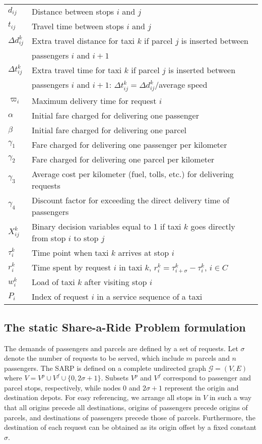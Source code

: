 \documentclass[preprint,authoryear,12pt]{elsarticle}
\begin{document}
\begin{table*}
\begin{tabular}{ll}
$d_{ij}$& Distance between stops $i$ and $j$\\
$t_{ij}$& Travel time between stops $i$ and $j$\\
$\Delta d_{ij}^{k}$ & Extra travel distance for taxi $k$ if parcel $j$ is inserted between \\
& passengers $i$ and $i+1$\\
$\Delta t_{ij}^{k}$ & Extra travel time for taxi $k$ if parcel $j$ is inserted between \\
&passengers $i$ and $i+1$: $\Delta t_{ij}^{k}=\Delta d_{ij}^{k}$/average speed\\
$\varpi_i$ & Maximum delivery time for request $i$\\
$\alpha$ & Initial fare charged for delivering one passenger\\
$\beta$  & Initial fare charged for delivering one parcel\\
$\gamma_1$ & Fare charged for delivering one passenger per kilometer\\
$\gamma_2$ & Fare charged for delivering one parcel per kilometer\\
$\gamma_3$ & Average cost per kilometer (fuel, tolls, etc.) for delivering requests\\
$\gamma_4$ & Discount factor for exceeding the direct delivery time of passengers\\
\hline
$X_{ij}^{k}$ & Binary decision variables equal to 1 if taxi $k$ goes
directly from stop $i$ to stop $j$\\
$\tau_i^k$& Time point when taxi $k$ arrives at stop $i$\\
$r_i^k$& Time spent by request $i$ in taxi $k$, $r_i^k=\tau_{i+\sigma}^k-\tau_{i}^k$, $i\in C$\\
$w_i^k$& Load of taxi $k$ after visiting stop $i$\\
$P_i$ & Index of request $i$ in a service sequence of a taxi\\
\hline
\end{tabular}
\label{notation}
\end{table*}



\subsection{The static Share-a-Ride Problem formulation}
\label{ssarp_model}
The demands of passengers and parcels are defined by a set of requests. Let $\sigma$ denote the number of requests to be served, which include $m$ parcels and $n$ passengers. The SARP is defined on a complete undirected graph $\mathcal{G} = (V,E)$ where $V = V^p\cup V^f \cup \{0,2\sigma+1\}$. Subsets $V^p$ and $V^f$ correspond to passenger and parcel stops, respectively, while nodes $0$ and $2\sigma + 1$ represent the origin and destination depots. For easy referencing, we arrange all stops in $V$ in such a way that all origins precede all destinations, origins of passengers precede origins of parcels, and destinations of passengers precede those of parcels. Furthermore, the destination of each request can be obtained as its origin offset by a fixed constant $\sigma$.
\end{document}
